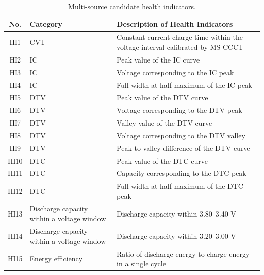 \begin{table}
\TableStyle
\caption{Multi-source candidate health indicators.}
\label{tab:2-2}
\begin{tabularx}{\linewidth}{@{\extracolsep{\fill}}C{0.30}L{0.65}L{2.05}@{}}
\toprule
No. & Category & Description of Health Indicators \\
\midrule
HI1 & CVT & Constant current charge time within the voltage interval calibrated by MS-CCCT \\
HI2 & IC & Peak value of the IC curve \\
HI3 & IC & Voltage corresponding to the IC peak \\
HI4 & IC & Full width at half maximum of the IC peak \\
HI5 & DTV & Peak value of the DTV curve \\
HI6 & DTV & Voltage corresponding to the DTV peak \\
HI7 & DTV & Valley value of the DTV curve \\
HI8 & DTV & Voltage corresponding to the DTV valley \\
HI9 & DTV & Peak-to-valley difference of the DTV curve \\
HI10 & DTC & Peak value of the DTC curve \\
HI11 & DTC & Capacity corresponding to the DTC peak \\
HI12 & DTC & Full width at half maximum of the DTC peak \\
HI13 & Discharge capacity within a voltage window & Discharge capacity within 3.80--3.40 V \\
HI14 & Discharge capacity within a voltage window & Discharge capacity within 3.20--3.00 V \\
HI15 & Energy efficiency & Ratio of discharge energy to charge energy in a single cycle \\
\bottomrule
\end{tabularx}
\end{table}
